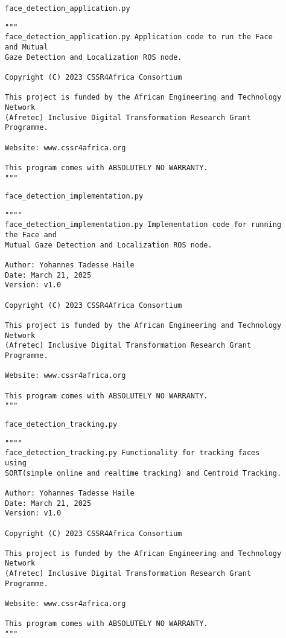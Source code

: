 \documentclass{CSSRforAfrica}
\newcommand{\blank}{~\\}
\newcommand{\checkboxChecked}{\fbox{\ding{51}}} %
\begin{document}
\begin{description}

\item[\checkboxChecked] {\small \verb+face_detection_application.py+}  
{\small \begin{verbatim}
"""
face_detection_application.py Application code to run the Face and Mutual 
Gaze Detection and Localization ROS node.

Copyright (C) 2023 CSSR4Africa Consortium

This project is funded by the African Engineering and Technology Network 
(Afretec) Inclusive Digital Transformation Research Grant Programme.

Website: www.cssr4africa.org

This program comes with ABSOLUTELY NO WARRANTY.
"""

\end{verbatim} }

\item[\checkboxChecked]  {\small \verb+face_detection_implementation.py+}  
{\small \begin{verbatim}
""""
face_detection_implementation.py Implementation code for running the Face and 
Mutual Gaze Detection and Localization ROS node.

Author: Yohannes Tadesse Haile
Date: March 21, 2025
Version: v1.0

Copyright (C) 2023 CSSR4Africa Consortium

This project is funded by the African Engineering and Technology Network 
(Afretec) Inclusive Digital Transformation Research Grant Programme.

Website: www.cssr4africa.org

This program comes with ABSOLUTELY NO WARRANTY.
"""
\end{verbatim} }

\newpage
\item[\checkboxChecked]  {\small \verb+face_detection_tracking.py+}  
{\small \begin{verbatim}
""""
face_detection_tracking.py Functionality for tracking faces using 
SORT(simple online and realtime tracking) and Centroid Tracking.

Author: Yohannes Tadesse Haile
Date: March 21, 2025
Version: v1.0

Copyright (C) 2023 CSSR4Africa Consortium

This project is funded by the African Engineering and Technology Network 
(Afretec) Inclusive Digital Transformation Research Grant Programme.

Website: www.cssr4africa.org

This program comes with ABSOLUTELY NO WARRANTY.
"""
\end{verbatim} }


\end{description} 
\end{document}
